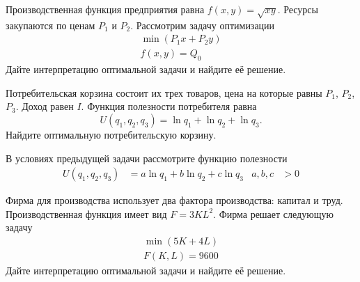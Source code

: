\begin{exercise}
Производственная функция предприятия равна $f(x,y)=\sqrt{xy}$. Ресурсы
закупаются по ценам $P_1$ и $P_2$. Рассмотрим задачу оптимизации
\begin{gather*}
	\min (P_1x+P_2 y) \\  f(x,y)=Q_0
\end{gather*}
Дайте интерпретацию оптимальной задачи и найдите её решение.
\end{exercise}

\begin{exercise}
Потребительская корзина состоит их трех товаров, цена на которые равны
$P_1$, $P_2$, $P_3$. Доход равен $I$.  Функция полезности потребителя равна
\[
	U(q_1,q_2,q_3)=\ln q_1+\ln q_2+\ln q_3.
\]
Найдите оптимальную потребительскую корзину.
\end{exercise}

\begin{exercise}
В условиях предыдущей задачи рассмотрите функцию полезности
\begin{align*}
	U(q_1,q_2,q_3)&=a\ln q_1+b\ln q_2+c\ln q_3 &
	a,b,c&>0
\end{align*}
\end{exercise}

\begin{exercise}
Фирма для производства использует два фактора производства: капитал и труд.
Производственная функция имеет вид $F=3KL^2$. Фирма решает следующую задачу
\begin{gather*}
	\min(5K+4L) \\ F(K,L)=9600
\end{gather*}
Дайте интерпретацию оптимальной задачи и найдите её решение. 
\end{exercise}

